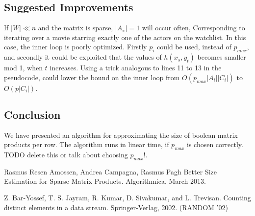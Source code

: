 \documentclass[a4paper,11pt]{article}
\begin{document}




%


\subsection{Suggested Improvements}
If $|W|\ll n$ and the matrix is sparse, $|A_{\pi}|=1$ will occur often, Corresponding to iterating over a movie starring exactly one of the actors on the watchlist. In this case, the inner loop is poorly optimized. Firstly $p_i$ could be used, instead of $p_{max}$, and secondly it could be exploited that the values of $h(x_s, y_t)$ becomes smaller mod 1, when $t$ increases. Using a trick analogous to lines 11 to 13 in the pseudocode, could lower the bound on the inner loop from $O(p_{max}|A_i||C_i|)$ to $O(p|C_i|)$.



\subsection{Conclusion}
We have presented an algorithm for approximating the size of boolean matrix products per row. The algorithm runs in linear time, if $p_{max}$ is chosen correctly. TODO delete this or talk about choosing $p_{max}$!.

\begin{thebibliography}{}

Rasmus Resen Amossen, Andrea Campagna, Rasmus Pagh
Better Size Estimation for Sparse Matrix Products. Algorithmica, March 2013.

Z. Bar-Yossef, T. S. Jayram, R. Kumar, D. Sivakumar, and L. Trevisan.
Counting distinct elements in a data stream. Springer-Verlag, 2002. (RANDOM '02)

\end{thebibliography}
\end{document}

